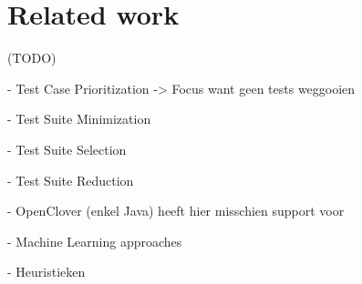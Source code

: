 \chapter{Related work}

(TODO)

  - Test Case Prioritization -> Focus want geen tests weggooien

- Test Suite Minimization

- Test Suite Selection

- Test Suite Reduction

- OpenClover (enkel Java) heeft hier misschien support voor

- Machine Learning approaches

- Heuristieken